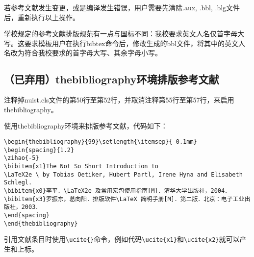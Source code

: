 若参考文献发生变更，或是编译发生错误，用户需要先清除.aux, .bbl, .blg文件后，重新执行以上操作。

学校规定的参考文献排版规范有一点与国标不同：我校要求英文人名仅首字母大写。这要求模板用户在执行bibtex命令后，修改生成的bbl文件，将其中的英文人名改为符合我校要求的首字母大写、其余字母小写。

\subsection{（已弃用）thebibliography环境排版参考文献}
注释掉nuist.cls文件的第50行至第52行，并取消注释第55行至第57行，来启用thebibliography。

使用thebibliography环境来排版参考文献，代码如下：
{\color{green!50!black}
\begin{lstlisting}[breaklines=true,]
\begin{thebibliography}{99}\setlength{\itemsep}{-0.1mm}
\begin{spacing}{1.2}
\zihao{-5}
\bibitem{x1}The Not So Short Introduction to 
\LaTeX2e \ by Tobias Oetiker, Hubert Partl, Irene Hyna and Elisabeth Schlegl.
\bibitem{x0}李平．\LaTeX2e 及常用宏包使用指南[M]．清华大学出版社，2004．
\bibitem{x3}罗振东，葛向阳．排版软件\LaTeX 简明手册[M]．第二版．北京：电子工业出版社，2003．
\end{spacing}
\end{thebibliography}
\end{lstlisting}
}
引用文献条目时使用\verb|\ucite{}|命令，例如代码\verb|\ucite{x1}|和\verb|\ucite{x2}|就可以产生\cite{x1}和\cite{x2}上标。
